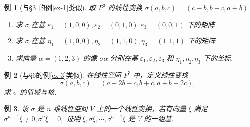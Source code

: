 \documentclass[13pt]{beamer}
\newtheorem{exa}{例}
\begin{document}
\begin{frame}
\begin{exa}[与\S 3 的例\ref{ex-1}类似]
取 $P^{3}$ 的线性变换 $\sigma(a, b, c)=(a-b, b-c, a+b)$
\begin{enumerate}
\item  求 $\sigma$ 在基 $\varepsilon_{1}=(1,0,0), \varepsilon_{2}=(0,1,0), \varepsilon_{3}=(0,0,1)$ 下的矩阵
\item  求 $\sigma$ 在基 $\eta_{1}=(1,0,0), \eta_{2}=(1,1,0), \eta_{3}=(1,1,1)$ 下的矩阵
\item  求向量 $\alpha=(1,2,3)$ 的像 $\sigma \alpha$ 分别在基 $\varepsilon_{1}, \varepsilon_{2}, \varepsilon_{3}$ 和 $\eta_{1}, \eta_{2}, \eta_{3}$ 下的坐标.
\end{enumerate}
\end{exa}
\end{frame}



\begin{frame}
\begin{exa}[与\S 6的例\ref{ex-3}类似]
	在线性空间 $P^{3}$ 中，定义线性变换 $$\sigma(a, b, c)=(a+2 b-c, b+c, a+b-2 c),$$ 求 $\sigma$ 的值域与核.
\end{exa}
\end{frame}

\begin{frame}
\begin{exa}
设 $\sigma$ 是 $n$ 维线性空间 $V$ 上的一个线性变换，若有向量 $\xi$ 满足 $\sigma^{n-1} \xi \neq 0, \sigma^{n} \xi=0,$ 证明 $\xi, \sigma \xi, \cdots, \sigma^{n-1} \xi$
是 $V$ 的一组基.
\end{exa}
\end{frame}
\end{document}
